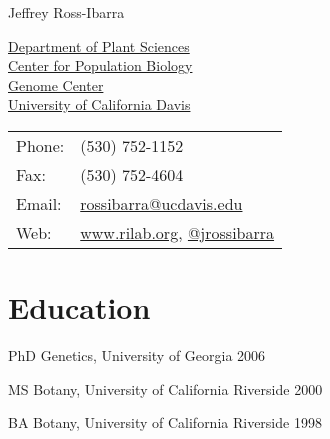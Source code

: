\documentclass[letterpaper]{article}
\def\name{Jeffrey Ross-Ibarra}
\renewenvironment{itemize}{
  \begin{list}{}{
    \setlength{\leftmargin}{1.5em}
  }
}{
  \end{list}
}
\begin{document}
{\huge \name}


\vspace{0.25in}

\begin{minipage}{0.55\linewidth}
  \href{http://www.plantsciences.ucdavis.edu/plantsciences/}{Department of Plant Sciences}\\
  \href{http://cpb.ucdavis.edu/}{Center for Population Biology}\\
  \href{http://www.genomecenter.ucdavis.edu/}{Genome Center}\\
  \href{http://www.ucdavis.edu/}{University of California Davis} \\
\end{minipage}
\begin{minipage}{0.35\linewidth}
  \begin{tabular}{ll}
    Phone: & (530) 752-1152 \\
    Fax: &  (530) 752-4604 \\
    Email: & \href{mailto:rossibarra@ucdavis.edu}{rossibarra@ucdavis.edu} \\
    Web: & \href{http://www.rilab.org/}{www.rilab.org}, \href{http://www.twitter.com/jrossibarra/}{@jrossibarra} \\
  \end{tabular}
\end{minipage}

\section*{Education}
\begin{itemize}
 \item PhD Genetics, University of Georgia 2006
  \item MS Botany, University of California Riverside 2000 
 \item BA Botany, University of California Riverside 1998 
\end{itemize}

\end{document}
